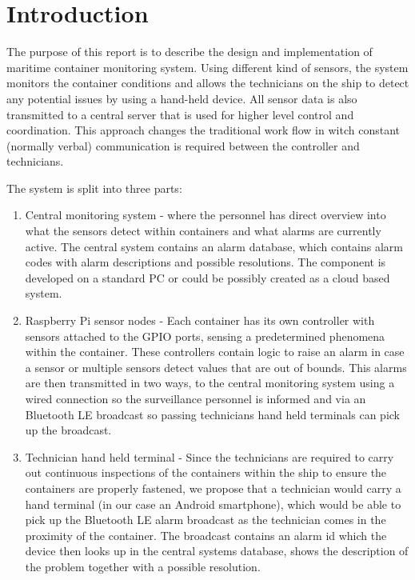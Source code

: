 \chapter{Introduction}
\label{cha:introduction}

The purpose of this report is to describe the design and implementation of maritime container monitoring system. Using different kind of sensors, the system monitors the container conditions and allows the technicians on the ship to detect any potential issues by using a hand-held device. All sensor data is also transmitted to a central server that is used for higher level control and coordination. This approach changes the traditional work flow in witch constant (normally verbal) communication is required between the controller and technicians.

The system is split into three parts:
\begin{enumerate}
\item Central monitoring system - where the personnel has direct overview into what the sensors detect within containers and what alarms are currently active. The central system contains an alarm database, which contains alarm codes with alarm descriptions and possible resolutions. The component is developed on a standard PC or could be possibly created as a cloud based system.

\item Raspberry Pi sensor nodes - Each container has its own controller with sensors attached to the GPIO ports, sensing a predetermined phenomena within the container. These controllers contain logic to raise an alarm in case a sensor or multiple sensors detect values that are out of bounds. This alarms are then transmitted in two ways, to the central monitoring system using a wired connection so the surveillance personnel is informed and via an Bluetooth LE broadcast so passing technicians hand held terminals can pick up the broadcast.

\item Technician hand held terminal - Since the technicians are required to carry out continuous inspections of the containers within the ship to ensure the containers are properly fastened, we propose that a technician would carry a hand terminal (in our case an Android smartphone), which would be able to pick up the Bluetooth LE alarm broadcast as the technician comes in the proximity of the container. The broadcast contains an alarm id which the device then looks up in the central systems database, shows the description of the problem together with a possible resolution.
\end{enumerate}

